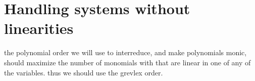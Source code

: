 \section*{Handling systems without linearities}
the polynomial order we will use to interreduce, and make polynomials monic, should maximize the number of monomials with that are linear in one of any of the variables. thus we should use the grevlex order.
